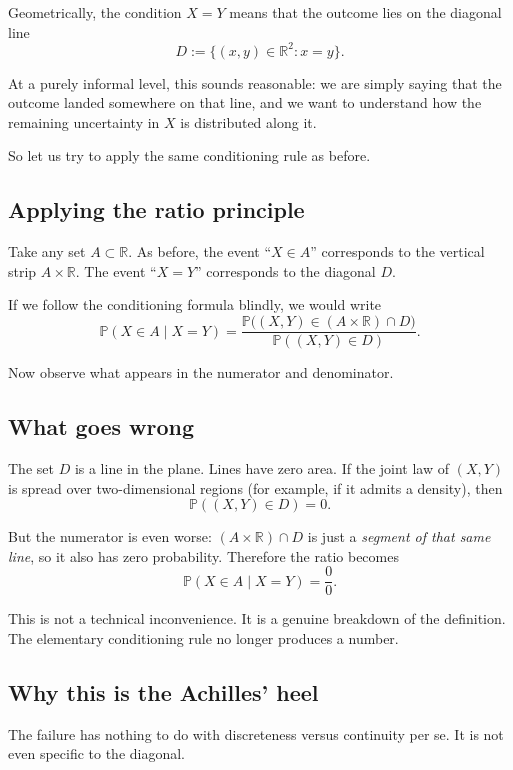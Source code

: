 \documentclass[11pt]{article}
\theoremstyle{remark}
\begin{document}
Geometrically, the condition \(X=Y\) means that the outcome lies on the
diagonal line
\[
D := \{(x,y)\in\mathbb{R}^2 : x=y\}.
\]

At a purely informal level, this sounds reasonable:
we are simply saying that the outcome landed somewhere on that line,
and we want to understand how the remaining uncertainty in \(X\) is distributed
along it.

So let us try to apply the same conditioning rule as before.

\subsection{Applying the ratio principle}

Take any set \(A\subset\mathbb{R}\).
As before, the event ``\(X\in A\)'' corresponds to the vertical strip
\(A\times\mathbb{R}\).
The event ``\(X=Y\)'' corresponds to the diagonal \(D\).

If we follow the conditioning formula blindly, we would write
\[
\mathbb{P}(X\in A \mid X=Y)
=
\frac{\mathbb{P}\big((X,Y)\in (A\times\mathbb{R}) \cap D\big)}
{\mathbb{P}((X,Y)\in D)}.
\]

Now observe what appears in the numerator and denominator.

\subsection{What goes wrong}

The set \(D\) is a line in the plane.
Lines have zero area.
If the joint law of \((X,Y)\) is spread over two-dimensional regions
(for example, if it admits a density),
then
\[
\mathbb{P}((X,Y)\in D)=0.
\]

But the numerator is even worse:
\((A\times\mathbb{R})\cap D\) is just a \emph{segment of that same line},
so it also has zero probability.
Therefore the ratio becomes
\[
\mathbb{P}(X\in A \mid X=Y)
=
\frac{0}{0}.
\]

This is not a technical inconvenience.
It is a genuine breakdown of the definition.
The elementary conditioning rule no longer produces a number.

\subsection{Why this is the Achilles' heel}

The failure has nothing to do with discreteness versus continuity per se.
It is not even specific to the diagonal.
\end{document}
